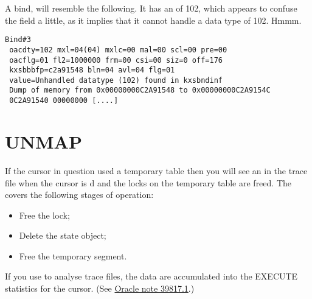 \label{ref-cursor-102}A  bind, will resemble the following. It has an  of 102, which appears to confuse the  field a little, as it implies that it cannot handle a data type of 102. Hmmm.

\begin{lstlisting}[numbers=none,caption={Bind Example - REF\_CURSOR}]
Bind#3
 oacdty=102 mxl=04(04) mxlc=00 mal=00 scl=00 pre=00
 oacflg=01 fl2=1000000 frm=00 csi=00 siz=0 off=176
 kxsbbbfp=c2a91548 bln=04 avl=04 flg=01
 value=Unhandled datatype (102) found in kxsbndinf
 Dump of memory from 0x00000000C2A91548 to 0x00000000C2A9154C
 0C2A91540 00000000 [....]
\end{lstlisting}

\newpage\section{UNMAP}\label{unmap}

If the cursor in question used a temporary table then you will see an  in the trace file when the cursor is d and the locks on the temporary table are freed. The  covers the following stages of operation:

\begin{itemize}
    \item Free the lock;
    \item Delete the state object;
    \item Free the temporary segment.
\end{itemize}

If you use  to analyse trace files, the  data are accumulated into the EXECUTE statistics for the cursor. (See \href{https://support.oracle.com/epmos/faces/DocumentDisplay?_afrLoop=444790128198237&id=39817.1}{Oracle note 39817.1}.)


